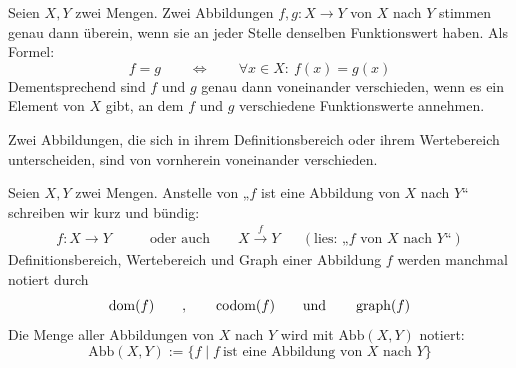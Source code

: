 \begin{axiom} \label{abbgleich}
    Seien $X,Y$ zwei Mengen. Zwei Abbildungen $f,g:X\to Y$ von $X$ nach $Y$ stimmen genau dann überein, wenn sie an jeder Stelle denselben Funktionswert haben. Als Formel:
        \[ f=g \qquad\Leftrightarrow\qquad \forall x\in X:\ f(x)=g(x) \]
    Dementsprechend sind $f$ und $g$ genau dann voneinander verschieden, wenn es ein Element von $X$ gibt, an dem $f$ und $g$ verschiedene Funktionswerte annehmen.
    
    Zwei Abbildungen, die sich in ihrem Definitionsbereich oder ihrem Wertebereich unterscheiden, sind von vornherein voneinander verschieden.
\end{axiom}


\begin{nota}
    Seien $X,Y$ zwei Mengen.
    Anstelle von „$f$ ist eine Abbildung von $X$ nach $Y$“ schreiben wir kurz und bündig:
    \begin{align*}
        f:X \to Y \qquad & \text{oder auch}\qquad X\xrightarrow{f} Y && (\text{lies: „$f$ von $X$ nach $Y$“})
    \end{align*}
    Definitionsbereich, Wertebereich und Graph einer Abbildung $f$ werden manchmal notiert durch
        \[ \operatorname{dom}(f)\qquad, \qquad \operatorname{codom}(f) \qquad\text{und}\qquad \operatorname{graph}(f)\]
    Die Menge aller Abbildungen von $X$ nach $Y$ wird mit $\text{Abb}(X,Y)$ notiert:
        \[ \text{Abb}(X,Y) := \{ f \mid f\ \text{ist eine Abbildung von $X$ nach $Y$} \} \]
\end{nota}


